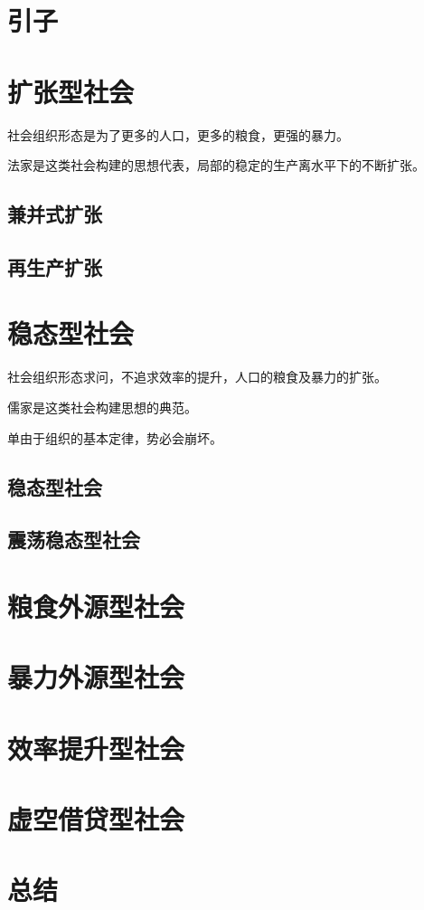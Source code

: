 \section{引子}
\section{扩张型社会}
社会组织形态是为了更多的人口，更多的粮食，更强的暴力。

法家是这类社会构建的思想代表，局部的稳定的生产离水平下的不断扩张。
\subsection{兼并式扩张}
\subsection{再生产扩张}

\section{稳态型社会}
社会组织形态求问，不追求效率的提升，人口的粮食及暴力的扩张。

儒家是这类社会构建思想的典范。

单由于组织的基本定律，势必会崩坏。
\subsection{稳态型社会}
\subsection{震荡稳态型社会}
\section{粮食外源型社会}
\section{暴力外源型社会}
\section{效率提升型社会}

\section{虚空借贷型社会}

\section{总结}

